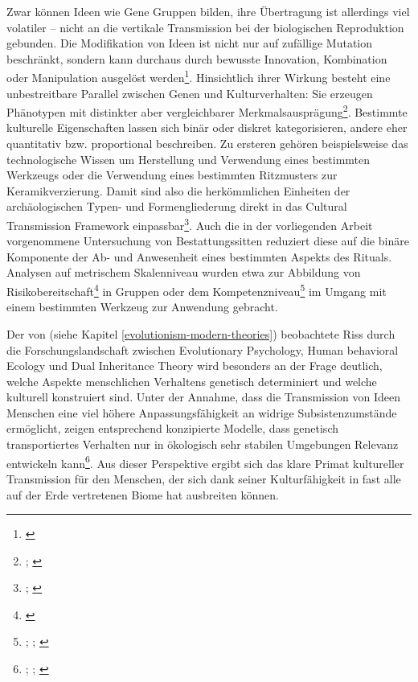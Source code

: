 \documentclass[openany,twoside,twocolumn]{book}
\let\rmarkdownfootnote\footnote%
\def\footnote{\protect\rmarkdownfootnote}
\begin{document}
Zwar können Ideen wie Gene Gruppen bilden, ihre Übertragung ist
allerdings viel volatiler -- nicht an die vertikale Transmission bei der
biologischen Reproduktion gebunden. Die Modifikation von Ideen ist nicht
nur auf zufällige Mutation beschränkt, sondern kann durchaus durch
bewusste Innovation, Kombination oder Manipulation ausgelöst
werden\footnote{\textcite{eerkens_cultural_2007}}. Hinsichtlich ihrer
Wirkung besteht eine unbestreitbare Parallel zwischen Genen und
Kulturverhalten: Sie erzeugen Phänotypen mit distinkter aber
vergleichbarer Merkmalsausprägung\footnote{\textcite{lyman_culture_2001};
  \textcite{lyman_rise_1997}}. Bestimmte kulturelle Eigenschaften lassen
sich binär oder diskret kategorisieren, andere eher quantitativ bzw.
proportional beschreiben. Zu ersteren gehören beispielsweise das
technologische Wissen um Herstellung und Verwendung eines bestimmten
Werkzeugs oder die Verwendung eines bestimmten Ritzmusters zur
Keramikverzierung. Damit sind also die herkömmlichen Einheiten der
archäologischen Typen- und Formengliederung direkt in das Cultural
Transmission Framework einpassbar\footnote{\textcite{lipo_science_2001};
  \textcite{lyman_cultural_2003}}. Auch die in der vorliegenden Arbeit
vorgenommene Untersuchung von Bestattungssitten reduziert diese auf die
binäre Komponente der Ab- und Anwesenheit eines bestimmten Aspekts des
Rituals. Analysen auf metrischem Skalenniveau wurden etwa zur Abbildung
von Risikobereitschaft\footnote{\textcite{bisin_economics_2001-1}} in
Gruppen oder dem Kompetenzniveau\footnote{\textcite{baldini_revisiting_2015};
  \textcite{henrich_demography_2004};
  \textcite{kobayashi_innovativeness_2012}} im Umgang mit einem
bestimmten Werkzeug zur Anwendung gebracht.

Der von \autocite{smith_three_2000} (siehe Kapitel
\ref{evolutionism-modern-theories}) beobachtete Riss durch die
Forschungslandschaft zwischen Evolutionary Psychology, Human behavioral
Ecology und Dual Inheritance Theory wird besonders an der Frage
deutlich, welche Aspekte menschlichen Verhaltens genetisch determiniert
und welche kulturell konstruiert sind. Unter der Annahme, dass die
Transmission von Ideen Menschen eine viel höhere Anpassungsfähigkeit an
widrige Subsistenzumstände ermöglicht, zeigen entsprechend konzipierte
Modelle, dass genetisch transportiertes Verhalten nur in ökologisch sehr
stabilen Umgebungen Relevanz entwickeln kann\footnote{\textcite{aoki_emergence_2005};
  \textcite{aoki_evolution_2014}; \textcite{boyd_cultural_1983}}. Aus
dieser Perspektive ergibt sich das klare Primat kultureller Transmission
für den Menschen, der sich dank seiner Kulturfähigkeit in fast alle auf
der Erde vertretenen Biome hat ausbreiten können.
\end{document}
